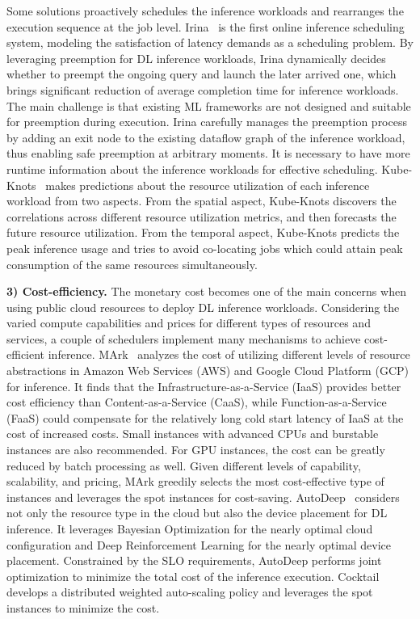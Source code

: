 Some solutions proactively schedules the inference workloads and rearranges the execution sequence at the job level. Irina~\cite{wu2020irina} is the first online inference scheduling system, modeling the satisfaction of latency demands as a scheduling problem. By leveraging preemption for DL inference workloads, Irina dynamically decides whether to preempt the ongoing query and launch the later arrived one, which brings significant reduction of average completion time for inference workloads. The main challenge is that existing ML frameworks are not designed and suitable for preemption during execution. Irina carefully manages the preemption process by adding an exit node to the existing dataflow graph of the inference workload, thus enabling safe preemption at arbitrary moments. It is necessary to have more runtime information about the inference workloads for effective scheduling.
Kube-Knots~\cite{Thinakaran2019kubeknots} makes predictions about the resource utilization of each inference workload from two aspects. From the spatial aspect, Kube-Knots discovers the correlations across different resource utilization metrics, and then forecasts the future resource utilization. From the temporal aspect, Kube-Knots predicts the peak inference usage and tries to avoid co-locating jobs which could attain peak consumption of the same resources simultaneously.

\textbf{3) Cost-efficiency.}
The monetary cost becomes one of the main concerns when using public cloud resources to deploy DL inference workloads. Considering the varied compute capabilities and prices for different types of resources and services, a couple of schedulers implement many mechanisms to achieve cost-efficient inference.
MArk~\cite{zhang2019mark,zhang2020mark}
analyzes the cost of utilizing different levels of resource abstractions in Amazon Web Services (AWS) and Google Cloud Platform (GCP) for inference. It finds that the Infrastructure-as-a-Service (IaaS) provides better cost efficiency than Content-as-a-Service (CaaS), while Function-as-a-Service (FaaS) could compensate for the relatively long cold start latency of IaaS at the cost of increased costs. Small instances with advanced CPUs and burstable instances are also recommended. For GPU instances, the cost can be greatly reduced by batch processing as well. Given different levels of capability, scalability, and pricing, MArk greedily selects the most cost-effective type of instances and leverages the spot instances for cost-saving.
AutoDeep~\cite{AutoDeep} considers not only the resource type in the cloud but also the device placement for DL inference. It leverages Bayesian Optimization for the nearly optimal cloud configuration and Deep Reinforcement Learning for the nearly optimal device placement. Constrained by the SLO requirements, AutoDeep performs joint optimization to minimize the total cost of the inference execution. Cocktail~\cite{Jashwant2021Cocktail} develops a distributed weighted auto-scaling policy and leverages the spot instances to minimize the cost.


